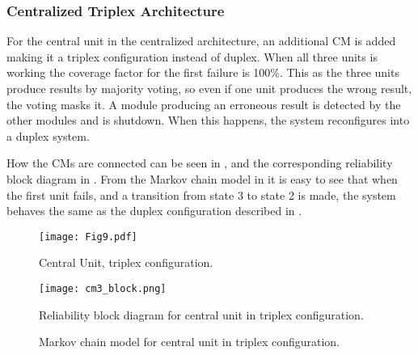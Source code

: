 \subsubsection{Centralized Triplex Architecture}
\label{subsec:cta}
For the central unit in the centralized architecture, an additional CM is added making it a triplex configuration instead of duplex. When all three units is working the coverage factor for the first failure is 100\%. This as the three units produce results by majority voting, so even if one unit produces the wrong result, the voting masks it. A module producing an erroneous result is detected by the other modules and is shutdown. When this happens, the system reconfigures into a duplex system. 

How the CMs are connected can be seen in , and the corresponding reliability block diagram in . From the Markov chain model in  it is easy to see that when the first unit fails, and a transition from state 3 to state 2 is made, the system behaves the same as the duplex configuration described in . 

\begin{figure}[H]
  \centering
  \texttt{[image: Fig9.pdf]}
  \caption{Central Unit, triplex configuration.}
  \label{fig9}
\end{figure}

\begin{figure}[H]
  \centering
  \texttt{[image: cm3\_block.png]}
  \caption{Reliability block diagram for central unit in triplex configuration.}
  \label{fig10}
\end{figure}
\begin{figure}[H]
  \centering
  \caption{Markov chain model for central unit in triplex configuration.}
  \label{fig11}
\end{figure}





